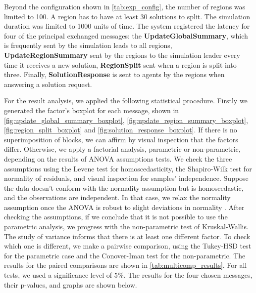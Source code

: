 \documentclass[preprint,12pt]{elsarticle}
\begin{document}
Beyond the configuration shown in \autoref{tab:exp_config}, the number of regions was limited to 100. A region has to have at least 30 solutions to split. The simulation duration was limited to 1000 units of time. The system registered the latency for four of the principal exchanged messages: the \textbf{UpdateGlobalSummary}, which is frequently sent by the simulation leads to all regions, \textbf{UpdateRegionSummary} sent by the regions to the simulation leader every time it receives a new solution, \textbf{RegionSplit} sent when a region is split into three. Finally, \textbf{SolutionResponse} is sent to agents by the regions when answering a solution request. 

For the result analysis, we applied the following statistical procedure. Firstly we generated the factor's boxplot for each message, shown in \ref{fig:update_global_summary_boxplot}, \ref{fig:update_region_summary_boxplot}, \ref{fig:region_split_boxplot} and \ref{fig:solution_response_boxplot}. If there is no superimposition of blocks, we can affirm by  visual inspection that the factors differ. Otherwise, we apply a factorial analysis, parametric or non-parametric, depending on the results of ANOVA assumptions tests. We check the three assumptions using the Levene test for homoscedasticity, the Shapiro-Wilk test for normality of residuals, and visual inspection for samples' independence. Suppose the data doesn't conform with the normality assumption but is homoscedastic, and the observations are independent. In that case, we relax the normality assumption once the ANOVA is robust to slight deviations in normality \cite{blanca2017}. After checking the assumptions, if we conclude that it is not possible to use the parametric analysis, we progress with the non-parametric test of Kruskal-Wallis. The study of variance informs that there is at least one different factor. To check which one is different, we make a pairwise comparison, using the Tukey-HSD test for the parametric case and the Conover-Iman test for the non-parametric. The results for the paired comparisons are shown in \autoref{tab:multicomp_results}. For all tests, we used a significance level of 5\%. The results for the four chosen messages, their p-values, and graphs are shown below. 
\end{document}
